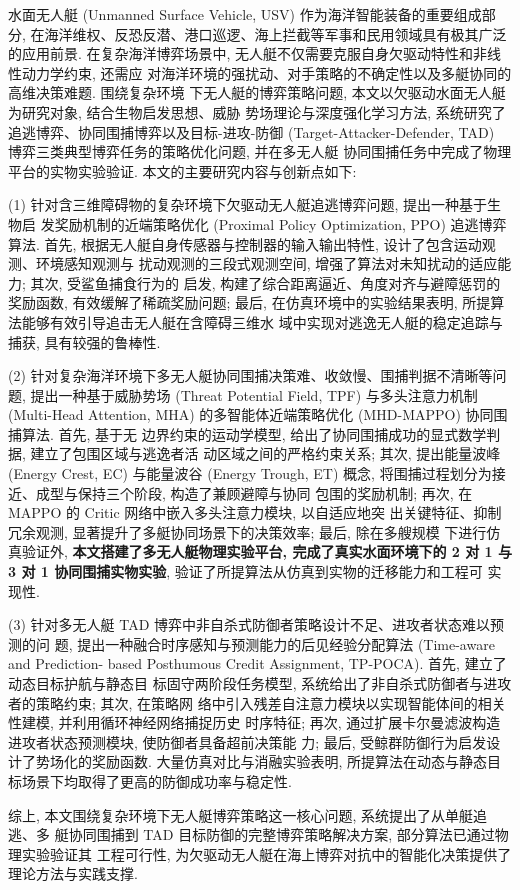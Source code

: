 \begin{cabstract}
水面无人艇 (Unmanned Surface Vehicle, USV) 作为海洋智能装备的重要组成部分,
在海洋维权、反恐反潜、港口巡逻、海上拦截等军事和民用领域具有极其广泛的应用前景.
在复杂海洋博弈场景中, 无人艇不仅需要克服自身欠驱动特性和非线性动力学约束, 还需应
对海洋环境的强扰动、对手策略的不确定性以及多艇协同的高维决策难题. 围绕复杂环境
下无人艇的博弈策略问题, 本文以欠驱动水面无人艇为研究对象, 结合生物启发思想、威胁
势场理论与深度强化学习方法, 系统研究了追逃博弈、协同围捕博弈以及目标-进攻-防御
(Target-Attacker-Defender, TAD) 博弈三类典型博弈任务的策略优化问题, 并在多无人艇
协同围捕任务中完成了物理平台的实物实验验证. 本文的主要研究内容与创新点如下:

(1) 针对含三维障碍物的复杂环境下欠驱动无人艇追逃博弈问题, 提出一种基于生物启
发奖励机制的近端策略优化 (Proximal Policy Optimization, PPO) 追逃博弈算法. 首先,
根据无人艇自身传感器与控制器的输入输出特性, 设计了包含运动观测、环境感知观测与
扰动观测的三段式观测空间, 增强了算法对未知扰动的适应能力; 其次, 受鲨鱼捕食行为的
启发, 构建了综合距离逼近、角度对齐与避障惩罚的奖励函数, 有效缓解了稀疏奖励问题;
最后, 在仿真环境中的实验结果表明, 所提算法能够有效引导追击无人艇在含障碍三维水
域中实现对逃逸无人艇的稳定追踪与捕获, 具有较强的鲁棒性.

(2) 针对复杂海洋环境下多无人艇协同围捕决策难、收敛慢、围捕判据不清晰等问题,
提出一种基于威胁势场 (Threat Potential Field, TPF) 与多头注意力机制 (Multi-Head
Attention, MHA) 的多智能体近端策略优化 (MHD-MAPPO) 协同围捕算法. 首先, 基于无
边界约束的运动学模型, 给出了协同围捕成功的显式数学判据, 建立了包围区域与逃逸者活
动区域之间的严格约束关系; 其次, 提出能量波峰 (Energy Crest, EC) 与能量波谷 (Energy
Trough, ET) 概念, 将围捕过程划分为接近、成型与保持三个阶段, 构造了兼顾避障与协同
包围的奖励机制; 再次, 在 MAPPO 的 Critic 网络中嵌入多头注意力模块, 以自适应地突
出关键特征、抑制冗余观测, 显著提升了多艇协同场景下的决策效率; 最后, 除在多艘规模
下进行仿真验证外, \textbf{本文搭建了多无人艇物理实验平台, 完成了真实水面环境下的
2 对 1 与 3 对 1 协同围捕实物实验}, 验证了所提算法从仿真到实物的迁移能力和工程可
实现性.

(3) 针对多无人艇 TAD 博弈中非自杀式防御者策略设计不足、进攻者状态难以预测的问
题, 提出一种融合时序感知与预测能力的后见经验分配算法 (Time-aware and Prediction-
based Posthumous Credit Assignment, TP-POCA). 首先, 建立了动态目标护航与静态目
标固守两阶段任务模型, 系统给出了非自杀式防御者与进攻者的策略约束; 其次, 在策略网
络中引入残差自注意力模块以实现智能体间的相关性建模, 并利用循环神经网络捕捉历史
时序特征; 再次, 通过扩展卡尔曼滤波构造进攻者状态预测模块, 使防御者具备超前决策能
力; 最后, 受鲸群防御行为启发设计了势场化的奖励函数. 大量仿真对比与消融实验表明,
所提算法在动态与静态目标场景下均取得了更高的防御成功率与稳定性.

综上, 本文围绕复杂环境下无人艇博弈策略这一核心问题, 系统提出了从单艇追逃、多
艇协同围捕到 TAD 目标防御的完整博弈策略解决方案, 部分算法已通过物理实验验证其
工程可行性, 为欠驱动无人艇在海上博弈对抗中的智能化决策提供了理论方法与实践支撑.
\end{cabstract}

